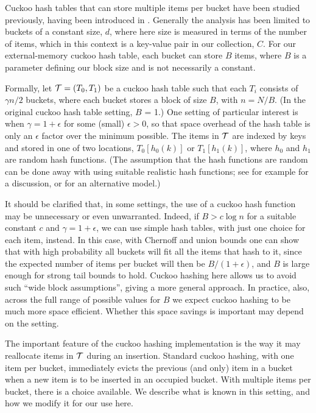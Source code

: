 \documentclass[11pt,letterpaper]{article}
\begin{document}
Cuckoo hash tables that can store multiple items per bucket have been
studied previously, having been introduced
in \cite{dw-badtpcs-07}.  Generally the analysis has been
limited to buckets of a constant size, $d$, where here size is
measured in terms of the number of items, which in this context is a
key-value pair in our collection, $C$.  For our external-memory cuckoo
hash table, each bucket can store $B$ items, where $B$ is a parameter defining our block size and is not necessarily a constant.

Formally, let ${\cal T}=(T_0,T_1)$ be a cuckoo hash table such that
each $T_i$ consists of $\gamma n/2$ buckets, where each bucket stores a
block of size $B$, with $n=N/B$.  (In the original cuckoo hash table setting,
$B$ = 1.)  One setting of particular interest
is when $\gamma = 1 + \epsilon$ for some (small) $\epsilon > 0$, so
that space overhead of the hash table is only an $\epsilon$ factor
over the minimum possible.  The items in $\cal T$ are indexed by keys
and stored in one of two locations, $T_0[h_0(k)]$ or $T_1[h_1(k)]$,
where $h_0$ and $h_1$ are random hash functions.  (The assumption that
the hash functions are random can be done away with using suitable
realistic hash functions; see for
example \cite{dw-badtpcs-07} for a discussion,
or \cite{mv-wshfw-08} for an alternative model.)

It should be clarified that, in some settings, the use of a cuckoo
hash function may be unnecessary or even unwarranted.  Indeed, if $B >
c \log n$ for a suitable constant $c$ and $\gamma = 1+\epsilon$, we
can use simple hash tables, with just one choice for each item,
instead.  In this case, with Chernoff and union bounds one can show
that with high probability all buckets will fit all the items that
hash to it, since the expected number of items per bucket will then be
$B/(1+\epsilon)$, and $B$ is large enough for strong tail bounds to
hold.  Cuckoo hashing here allows us to avoid such ``wide block
assumptions'', giving a more general approach.  In practice, also,
across the full range of possible values for $B$ we expect cuckoo
hashing to be much more space efficient.  Whether this space savings
is important may depend on the setting.

The important feature of the cuckoo hashing implementation is the way
it may reallocate items in $\cal T$ during an insertion.  Standard
cuckoo hashing, with one item per bucket, immediately evicts the
previous (and only) item in a bucket when a new item is to be inserted
in an occupied bucket.  With multiple items per bucket, there is a
choice available.  We describe what is known in this setting, and how
we modify it for our use here.
\end{document}
